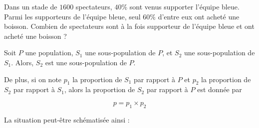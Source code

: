 \documentclass{article}
\begin{document}
\begin{example}
Dans un stade de $1600$ spectateurs, $40\%$ sont venus supporter l'équipe bleue. Parmi les supporteurs de l'équipe bleue, seul $60\%$ d'entre eux ont acheté une boisson. Combien de spectateurs sont à la fois supporteur de l'équipe bleue et ont acheté une boisson ?

\vspace*{0.2cm}
\emptybox{2cm}
\end{example}
\begin{proposition}
Soit $P$ une population, $S_1$ une sous-population de $P$, et $S_2$ une sous-population de $S_1$. Alors, $S_2$ est une sous-population de $P$.

De plus, si on note $p_1$ la proportion de $S_1$ par rapport à $P$ et $p_2$ la proportion de $S_2$ par rapport à $S_1$, alors la proportion de $S_2$ par rapport à $P$ est donnée par

\begin{equation*}
p = p_1 \times p_2
\end{equation*}
\end{proposition}
\begin{remark}
\begin{enumquestions}
\item La situation peut-être schématisée ainsi :

\begin{center}
\end{center}
\end{enumquestions}
\end{remark}
\end{document}
